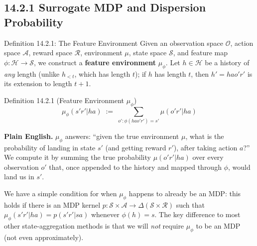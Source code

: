\documentclass[aspectratio=169,10pt]{beamer}
\newcommand{\Hc}{\mathcal{H}}
\newcommand{\Sc}{\mathcal{S}}
\newcommand{\Ac}{\mathcal{A}}
\newcommand{\Oc}{\mathcal{O}}
\newcommand{\Rc}{\mathcal{R}}
\newcommand{\hlt}{h_{<t}}
\begin{document}
\subsection{14.2.1 Surrogate MDP and Dispersion Probability}

\begin{frame}{Definition 14.2.1: The Feature Environment}
  Given an observation space $\Oc$, action space $\Ac$, reward space
  $\Rc$, environment $\mu$, state space $\Sc$, and feature map
  $\phi:\Hc\to\Sc$, we construct a \textbf{feature environment}
  $\mu_\phi$. Let $h\in\Hc$ be a history of \emph{any} length (unlike
  $\hlt$, which has length $t$); if $h$ has length $t$, then
  $h'=hao'r'$ is its extension to length $t{+}1$.
  \begin{block}{Definition 14.2.1 (Feature Environment $\mu_\phi$)}
    \[
      \mu_\phi(s'r'|ha) \;:=\; \sum_{o':\phi(hao'r')=s'} \mu(o'r'|ha)
    \]
  \end{block}
  \textbf{Plain English.} $\mu_\phi$ answers: ``given the true environment
  $\mu$, what is the probability of landing in state $s'$ (and getting
  reward $r'$), after taking action $a$?'' We compute it by summing the
  true probability $\mu(o'r'|ha)$ over every observation $o'$ that, once
  appended to the history and mapped through $\phi$, would land us in
  $s'$.

  \vspace{0.4em}
  We have a simple condition for when $\mu_\phi$ happens to already be an
  MDP: this holds if there is an MDP kernel $p:\Sc\times\Ac\to\Delta(\Sc\times\Rc)$
  such that $\mu_\phi(s'r'|ha)=p(s'r'|sa)$ whenever $\phi(h)=s$. The key
  difference to most other state-aggregation methods is that we will
  \emph{not} require $\mu_\phi$ to be an MDP (not even approximately).
\end{frame}
\end{document}
